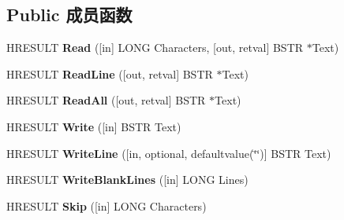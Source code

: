 \subsection*{Public 成员函数}
\begin{DoxyCompactItemize}
\item 
\mbox{\label{interface_i_host_1_1_i_text_stream_a5a134071e45277787b47e7cd82907eae}} 
H\+R\+E\+S\+U\+LT {\bfseries Read} (\mbox{[}in\mbox{]} L\+O\+NG Characters, \mbox{[}out, retval\mbox{]} B\+S\+TR $\ast$Text)
\item 
\mbox{\label{interface_i_host_1_1_i_text_stream_acec2ca0591d02841cda583d011179600}} 
H\+R\+E\+S\+U\+LT {\bfseries Read\+Line} (\mbox{[}out, retval\mbox{]} B\+S\+TR $\ast$Text)
\item 
\mbox{\label{interface_i_host_1_1_i_text_stream_a444c00e0d5e8b20d182c43d176b29b7e}} 
H\+R\+E\+S\+U\+LT {\bfseries Read\+All} (\mbox{[}out, retval\mbox{]} B\+S\+TR $\ast$Text)
\item 
\mbox{\label{interface_i_host_1_1_i_text_stream_a9a4e42d787940d1fc448226e72858803}} 
H\+R\+E\+S\+U\+LT {\bfseries Write} (\mbox{[}in\mbox{]} B\+S\+TR Text)
\item 
\mbox{\label{interface_i_host_1_1_i_text_stream_af765e8bc22b2d391f88a80dfb883384e}} 
H\+R\+E\+S\+U\+LT {\bfseries Write\+Line} (\mbox{[}in, optional, defaultvalue(\char`\"{}\char`\"{})\mbox{]} B\+S\+TR Text)
\item 
\mbox{\label{interface_i_host_1_1_i_text_stream_a9cd01ac64b71dce6fe004fdc0818f333}} 
H\+R\+E\+S\+U\+LT {\bfseries Write\+Blank\+Lines} (\mbox{[}in\mbox{]} L\+O\+NG Lines)
\item 
\mbox{\label{interface_i_host_1_1_i_text_stream_a28c7f0ec5aea72aa4821493d5f06d599}} 
H\+R\+E\+S\+U\+LT {\bfseries Skip} (\mbox{[}in\mbox{]} L\+O\+NG Characters)
\item 
\mbox{\label{interface_i_host_1_1_i_text_stream_af33e1deda64853c6029ede63d9503f99}} 

\end{DoxyCompactItemize}
